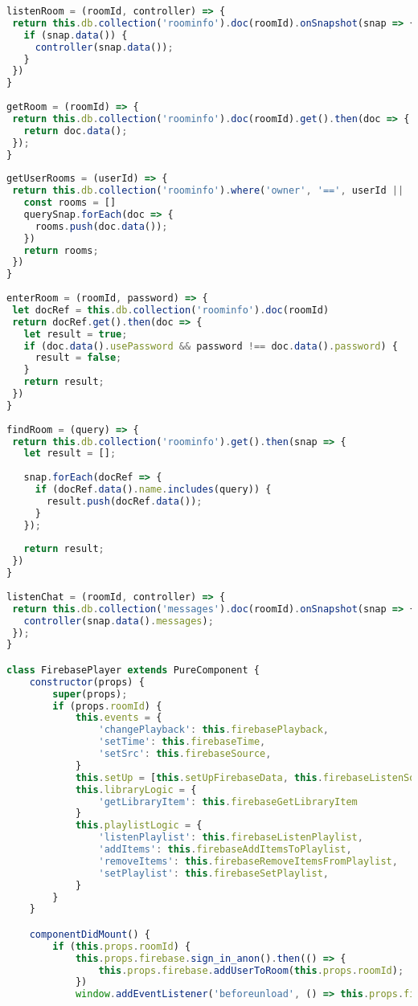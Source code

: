 \begin{lstlisting}[language=JavaScript,label={lst:add:player}]
listenRoom = (roomId, controller) => {
 return this.db.collection('roominfo').doc(roomId).onSnapshot(snap => {
   if (snap.data()) {
     controller(snap.data());
   }
 })
}
 
getRoom = (roomId) => {
 return this.db.collection('roominfo').doc(roomId).get().then(doc => {
   return doc.data();
 });
}
 
getUserRooms = (userId) => {
 return this.db.collection('roominfo').where('owner', '==', userId || '').get().then((querySnap) => {
   const rooms = []
   querySnap.forEach(doc => {
     rooms.push(doc.data());
   })
   return rooms;
 })
}
 
enterRoom = (roomId, password) => {
 let docRef = this.db.collection('roominfo').doc(roomId)
 return docRef.get().then(doc => {
   let result = true;
   if (doc.data().usePassword && password !== doc.data().password) {
     result = false;
   }
   return result;
 })
}
 
findRoom = (query) => {
 return this.db.collection('roominfo').get().then(snap => {
   let result = [];
 
   snap.forEach(docRef => {
     if (docRef.data().name.includes(query)) {
       result.push(docRef.data());
     }
   });
 
   return result;
 })
}
 
listenChat = (roomId, controller) => {
 return this.db.collection('messages').doc(roomId).onSnapshot(snap => {
   controller(snap.data().messages);
 });
}

class FirebasePlayer extends PureComponent {
    constructor(props) {
        super(props);
        if (props.roomId) {
            this.events = {
                'changePlayback': this.firebasePlayback,
                'setTime': this.firebaseTime,
                'setSrc': this.firebaseSource,
            }
            this.setUp = [this.setUpFirebaseData, this.firebaseListenSource, this.firebaseListenPlayback, this.firebaseListenTime]
            this.libraryLogic = {
                'getLibraryItem': this.firebaseGetLibraryItem
            }
            this.playlistLogic = {
                'listenPlaylist': this.firebaseListenPlaylist,
                'addItems': this.firebaseAddItemsToPlaylist,
                'removeItems': this.firebaseRemoveItemsFromPlaylist,
                'setPlaylist': this.firebaseSetPlaylist,
            }
        }
    }

    componentDidMount() {
        if (this.props.roomId) {
            this.props.firebase.sign_in_anon().then(() => {
                this.props.firebase.addUserToRoom(this.props.roomId);
            })
            window.addEventListener('beforeunload', () => this.props.firebase.removeUserFromRoom(this.props.roomId));


\end{lstlisting}
